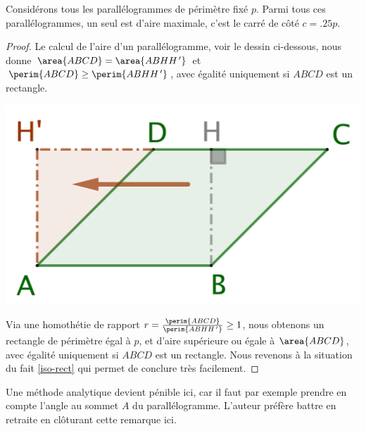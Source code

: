 \begin{fact} \label{iso-para}
	Considérons tous les parallélogrammes de périmètre fixé $p$. Parmi tous ces parallélogrammes, un seul est d'aire maximale, c'est le carré de côté $c = \num{.25} p$.
\end{fact}


\begin{proof}
	Le calcul de l'aire d'un parallélogramme, voir le dessin ci-dessous, nous donne 
	$\area{ABCD} = \area{ABHH^{\,\prime}}$ et 
	$\perim{ABCD} \geq \perim{ABHH^{\,\prime}}$, 
	avec égalité uniquement si $ABCD$ est un rectangle. 
	
	\begin{center}
		\includegraphics[scale=.4]{content/parallelogram/para-2-rect.png}
	\end{center}
	
	Via une homothétie de rapport $r = \frac{\perim{ABCD}}{\perim{ABHH^{\,\prime}}} \geq 1$, nous obtenons un rectangle 
	de périmètre égal à $p$,
	et d'aire supérieure ou égale à $\area{ABCD}$, 
	avec égalité uniquement si $ABCD$ est un rectangle.
	Nous revenons à la situation du fait \ref{iso-rect} qui permet de conclure très facilement.
\end{proof}




\begin{remark}
	Une méthode analytique devient pénible ici, car il faut par exemple prendre en compte l'angle au sommet $A$ du parallélogramme. L'auteur préfère battre en retraite en clôturant cette remarque ici.
\end{remark}

